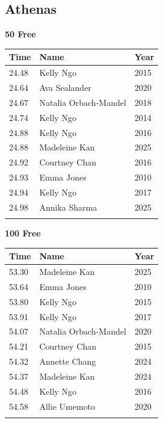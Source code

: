 
\clearpage
{}

\clearpage
\subsection{Athenas}
\vspace{1.2em}
\noindent\begin{minipage}[t]{0.48\textwidth}
\centering
\textbf{\textcolor{teamprimary}{50 Free}}\par
\vspace{0.5em}
\centering
\small
\renewcommand{\arraystretch}{1.0}
\setlength{\tabcolsep}{4pt}
\begin{tabular}{@{}p{1.8cm}p{3.0cm}p{1.0cm}@{}}
\toprule
\textbf{Time} & \textbf{Name} & \textbf{Year} \\
\midrule
24.48 & Kelly Ngo & 2015 \\
24.64 & Ava Sealander & 2020 \\
24.67 & Natalia Orbach-Mandel & 2018 \\
24.74 & Kelly Ngo & 2014 \\
24.88 & Kelly Ngo & 2016 \\
24.88 & Madeleine Kan & 2025 \\
24.92 & Courtney Chan & 2016 \\
24.93 & Emma Jones & 2010 \\
24.94 & Kelly Ngo & 2017 \\
24.98 & Annika Sharma & 2025 \\
\bottomrule
\vspace{0.5em}
\end{tabular}
\end{minipage}
\hfill
\begin{minipage}[t]{0.48\textwidth}
\centering
\textbf{\textcolor{teamprimary}{100 Free}}\par
\vspace{0.5em}
\centering
\small
\renewcommand{\arraystretch}{1.0}
\setlength{\tabcolsep}{4pt}
\begin{tabular}{@{}p{1.8cm}p{3.0cm}p{1.0cm}@{}}
\toprule
\textbf{Time} & \textbf{Name} & \textbf{Year} \\
\midrule
53.30 & Madeleine Kan & 2025 \\
53.64 & Emma Jones & 2010 \\
53.80 & Kelly Ngo & 2015 \\
53.91 & Kelly Ngo & 2017 \\
54.07 & Natalia Orbach-Mandel & 2020 \\
54.21 & Courtney Chan & 2015 \\
54.32 & Annette Chang & 2024 \\
54.37 & Madeleine Kan & 2024 \\
54.48 & Kelly Ngo & 2016 \\
54.58 & Allie Umemoto & 2020 \\
\bottomrule
\vspace{0.5em}
\end{tabular}
\end{minipage}
